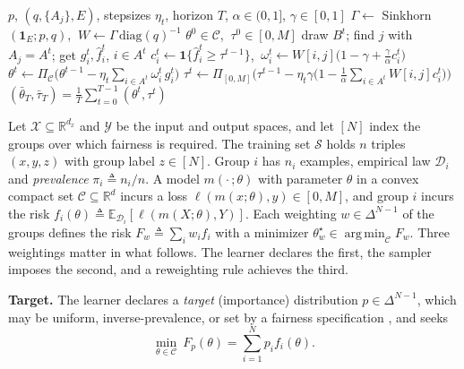 \documentclass{article}
\theoremstyle{definition}
\newcommand{\R}{\mathbb{R}}
\newcommand{\E}{\mathbb{E}}
\newcommand{\Nn}[1]{[#1]}
\newcommand{\simplex}[1]{\Delta^{#1-1}}
\newcommand{\Proj}{\Pi_{\mathcal{C}}}
\newcommand{\avot}{\textsf{GAVOT}}
\DeclareMathOperator*{\argmin}{arg\,min}
\begin{document}
\begin{algorithm}[t]
\caption{Group-fair SGD by masked transport (\avot{})}
\label{alg:gavot}
\small
\begin{algorithmic}[1]
\Require $p$, $(q,\{A_j\},E)$, stepsizes $\eta_t$, horizon $T$,
$\alpha\in(0,1]$, $\gamma\in[0,1]$
\State $\Gamma\leftarrow$ Sinkhorn$(\mathbf 1_E;p,q)$,
$\ W\leftarrow\Gamma\,\mathrm{diag}(q)^{-1}$ 
\State $\theta^0\in\mathcal{C}$, $\ \tau^0\in[0,M]$
  \State draw $B^t$; find $j$ with $A_j=A^t$; get $g^t_i,\hat f^t_i$, $i\in A^t$
  \State $c^t_i\leftarrow\mathbf{1}\{\hat f^t_i\ge\tau^{t-1}\}$, $\ \omega^t_i\leftarrow W[i,j]\big(1-\gamma+\tfrac{\gamma}{\alpha}c^t_i\big)$
  \State $\theta^{t}\leftarrow\Proj\big(\theta^{t-1}-\eta_t\sum_{i\in A^t}\omega^t_i\,g^t_i\big)$
  \State $\tau^{t}\leftarrow\Pi_{[0,M]}\big(\tau^{t-1}-\eta_t\gamma\big(1-\tfrac{1}{\alpha}\sum_{i\in A^t}W[i,j]c^t_i\big)\big)$
\EndFor
\Ensure $(\bar\theta_T,\bar\tau_T)=\frac{1}{T}\sum_{t=0}^{T-1}(\theta^t,\tau^t)$
\end{algorithmic}
\end{algorithm}
Let $\mathcal{X}\subseteq\R^{d_x}$ and $\mathcal{Y}$ be the input and
output spaces, and let $\Nn{N}$ index the groups over which fairness is
required. The training set $\mathcal{S}$ holds $n$ triples $(x,y,z)$ with
group label $z\in\Nn{N}$. Group $i$ has $n_i$ examples, empirical law
$\mathcal{D}_i$ and \emph{prevalence} $\pi_i\triangleq n_i/n$. A model
$m(\cdot\,;\theta)$ with parameter $\theta$ in a convex compact set
$\mathcal{C}\subseteq\R^{d}$ incurs a loss $\ell(m(x;\theta),y)\in[0,M]$,
and group $i$ incurs the risk
$f_i(\theta)\triangleq\E_{\mathcal{D}_i}[\ell(m(X;\theta),Y)]$. Each
weighting $w\in\simplex{N}$ of the groups defines the risk
$F_w\triangleq\sum_iw_if_i$ with a minimizer
$\theta^\star_w\in\argmin_{\mathcal{C}}F_w$. Three weightings matter in
what follows. The learner declares the first, the sampler imposes the
second, and a reweighting rule achieves the third.

\noindent\textbf{Target.} The learner declares a \emph{target}
(importance) distribution $p\in\simplex{N}$, which may be uniform,
inverse-prevalence, or set by a fairness specification
\cite{mohri2019agnostic,li2020fair}, and seeks
\vspace{-4pt}
\begin{equation}
\min_{\theta\in\mathcal{C}}\ F_p(\theta)=\textstyle\sum_{i=1}^{N}p_if_i(\theta).
\label{eq:target}
\end{equation}
\vspace{-10pt}
\end{document}
